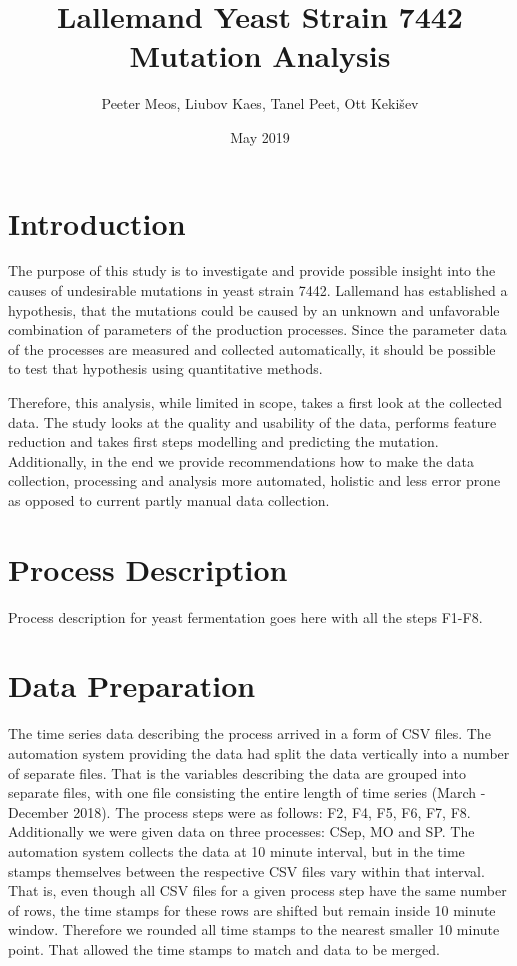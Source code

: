 \documentclass{article}
\title{Lallemand Yeast Strain 7442 Mutation Analysis}
\author{Peeter Meos, Liubov Kaes, Tanel Peet, Ott Keki{\v s}ev}
\affil{Proekspert AS}
\date{May 2019}
\begin{document}
\maketitle

\tableofcontents
\listoffigures

\section{Introduction}
The purpose of this study is to investigate and provide possible insight into the causes of undesirable mutations in yeast strain 7442. Lallemand has established a hypothesis, that the mutations could be caused by an unknown and unfavorable combination of parameters of the production processes. Since the parameter data  of the processes are measured and collected automatically, it should be possible to test that hypothesis using quantitative methods.

Therefore, this analysis, while limited in scope, takes a first look at the collected data. The study looks at the quality and usability of the data, performs feature reduction and takes first steps modelling and predicting the mutation. Additionally, in the end we provide recommendations how to make the data collection, processing and analysis more automated, holistic and less error prone as opposed to current partly manual data collection.

\section{Process Description}
Process description for yeast fermentation goes here with all the steps F1-F8.

\section{Data Preparation}
The time series data describing the process arrived in a form of CSV files. The automation system providing the data had split the data vertically into a number of separate files. That is the variables describing the data are grouped into separate files, with one file consisting the entire length of time series (March - December 2018). The process steps were as follows: F2, F4, F5, F6, F7, F8. Additionally we were given data on three processes: CSep, MO and SP. The automation system collects the data at 10 minute interval, but in the time stamps themselves between the respective CSV files vary within that interval. That is, even though all CSV files for a given process step have the same number of rows, the time stamps for these rows are shifted but remain inside 10 minute window. Therefore we rounded all time stamps to the nearest smaller 10 minute point. That allowed the time stamps to match and data to be merged.
\end{document}
